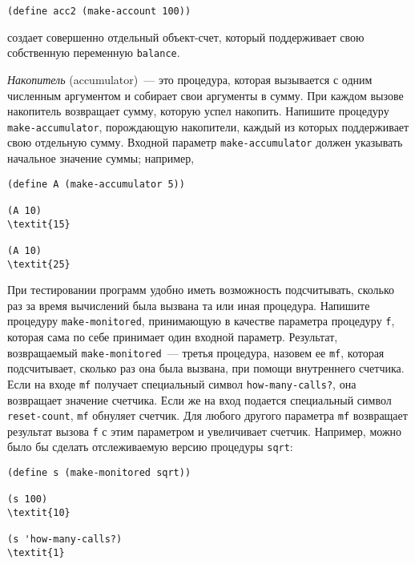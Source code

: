 \begin{Verbatim}[fontsize=\small]
(define acc2 (make-account 100))
\end{Verbatim}
создает совершенно отдельный объект-счет, который поддерживает свою
собственную переменную {\tt balance}.
\begin{exercise}{3.1}\label{EX3.1}%
%
%
{\em Накопитель} (accumulator)~--- это
процедура, которая вызывается с одним численным аргументом и собирает
свои аргументы в сумму.  При каждом вызове накопитель возвращает
сумму, которую успел накопить.  Напишите процедуру
{\tt make-accumulator},
порождающую накопители, каждый
из которых поддерживает свою отдельную сумму.  Входной параметр
{\tt make-accumulator} должен указывать начальное значение
суммы; например,

\begin{Verbatim}[fontsize=\small]
(define A (make-accumulator 5))

(A 10)
\textit{15}

(A 10)
\textit{25}
\end{Verbatim}
\end{exercise}
\begin{exercise}{3.2}\label{EX3.2}%
При тестировании программ удобно иметь
возможность подсчитывать, сколько раз за время вычислений была вызвана
та или иная процедура.%
%
 Напишите процедуру {\tt make-monitored}, принимающую в качестве параметра процедуру {\tt f}, которая сама
по себе принимает один входной параметр.  Результат, возвращаемый
{\tt make-monitored}~--- третья процедура, назовем ее
{\tt mf}, которая подсчитывает, сколько раз она была вызвана,
при помощи внутреннего счетчика.  Если на входе {\tt mf}
получает специальный символ {\tt how-many-calls?}, она
возвращает значение счетчика.  Если же на вход подается специальный
символ {\tt reset-count}, {\tt mf} обнуляет счетчик.
Для любого другого параметра {\tt mf} возвращает результат
вызова {\tt f} с этим параметром и увеличивает счетчик.
Например, можно было бы сделать отслеживаемую версию процедуры
{\tt sqrt}:

\begin{Verbatim}[fontsize=\small]
(define s (make-monitored sqrt))

(s 100)
\textit{10}

(s 'how-many-calls?)
\textit{1}
\end{Verbatim}
\end{exercise}
